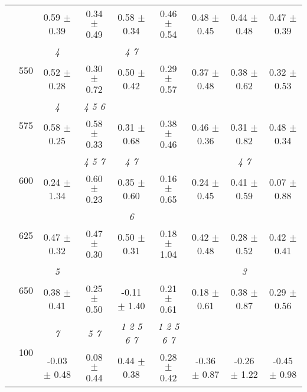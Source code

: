 \begin{table}[h]
{\begin{tabular}{
        ccccccccc}
 & & \cellcolor[HTML]{EFEFEF} 0.59 $\pm$ 0.39& \cellcolor[HTML]{EFEFEF} 0.34 $\pm$ 0.49& \cellcolor[HTML]{EFEFEF} 0.58 $\pm$ 0.34& \cellcolor[HTML]{EFEFEF} 0.46 $\pm$ 0.54& \cellcolor[HTML]{EFEFEF} 0.48 $\pm$ 0.45& \cellcolor[HTML]{EFEFEF} 0.44 $\pm$ 0.48& \cellcolor[HTML]{EFEFEF} 0.47 $\pm$ 0.39 \\ 
 & \multirow{2}{*}{550}& \textit{ 4 }& & \textit{ 4 7 }& & & &  \\ 
 & & 0.52 $\pm$ 0.28& 0.30 $\pm$ 0.72& 0.50 $\pm$ 0.42& 0.29 $\pm$ 0.57& 0.37 $\pm$ 0.48& 0.38 $\pm$ 0.62& 0.32 $\pm$ 0.53 \\ 
 & \multirow{2}{*}{575}& \cellcolor[HTML]{EFEFEF} \textit{ 4 }& \cellcolor[HTML]{EFEFEF} \textit{ 4 5 6 }& \cellcolor[HTML]{EFEFEF} & \cellcolor[HTML]{EFEFEF} & \cellcolor[HTML]{EFEFEF} & \cellcolor[HTML]{EFEFEF} & \cellcolor[HTML]{EFEFEF}  \\ 
 & & \cellcolor[HTML]{EFEFEF} 0.58 $\pm$ 0.25& \cellcolor[HTML]{EFEFEF} 0.58 $\pm$ 0.33& \cellcolor[HTML]{EFEFEF} 0.31 $\pm$ 0.68& \cellcolor[HTML]{EFEFEF} 0.38 $\pm$ 0.46& \cellcolor[HTML]{EFEFEF} 0.46 $\pm$ 0.36& \cellcolor[HTML]{EFEFEF} 0.31 $\pm$ 0.82& \cellcolor[HTML]{EFEFEF} 0.48 $\pm$ 0.34 \\ 
 & \multirow{2}{*}{600}& & \textit{ 4 5 7 }& \textit{ 4 7 }& & & \textit{ 4 7 }&  \\ 
 & & 0.24 $\pm$ 1.34& 0.60 $\pm$ 0.23& 0.35 $\pm$ 0.60& 0.16 $\pm$ 0.65& 0.24 $\pm$ 0.45& 0.41 $\pm$ 0.59& 0.07 $\pm$ 0.88 \\ 
 & \multirow{2}{*}{625}& \cellcolor[HTML]{EFEFEF} & \cellcolor[HTML]{EFEFEF} & \cellcolor[HTML]{EFEFEF} \textit{ 6 }& \cellcolor[HTML]{EFEFEF} & \cellcolor[HTML]{EFEFEF} & \cellcolor[HTML]{EFEFEF} & \cellcolor[HTML]{EFEFEF}  \\ 
 & & \cellcolor[HTML]{EFEFEF} 0.47 $\pm$ 0.32& \cellcolor[HTML]{EFEFEF} 0.47 $\pm$ 0.30& \cellcolor[HTML]{EFEFEF} 0.50 $\pm$ 0.31& \cellcolor[HTML]{EFEFEF} 0.18 $\pm$ 1.04& \cellcolor[HTML]{EFEFEF} 0.42 $\pm$ 0.48& \cellcolor[HTML]{EFEFEF} 0.28 $\pm$ 0.52& \cellcolor[HTML]{EFEFEF} 0.42 $\pm$ 0.41 \\ 
 & \multirow{2}{*}{650}& \textit{ 5 }& & & & & \textit{ 3 }&  \\ 
 & & 0.38 $\pm$ 0.41& 0.25 $\pm$ 0.50& -0.11 $\pm$ 1.40& 0.21 $\pm$ 0.61& 0.18 $\pm$ 0.61& 0.38 $\pm$ 0.87& 0.29 $\pm$ 0.56 \\ \midrule 
 & \multirow{2}{*}{100}& \textit{ 7 }& \textit{ 5 7 }& \textit{ 1 2 5 6 7 }& \textit{ 1 2 5 6 7 }& & &  \\ 
 & & -0.03 $\pm$ 0.48& 0.08 $\pm$ 0.44& 0.44 $\pm$ 0.38& 0.28 $\pm$ 0.42& -0.36 $\pm$ 0.87& -0.26 $\pm$ 1.22& -0.45 $\pm$ 0.98 \\ 

\end{tabular}}
\end{table}
